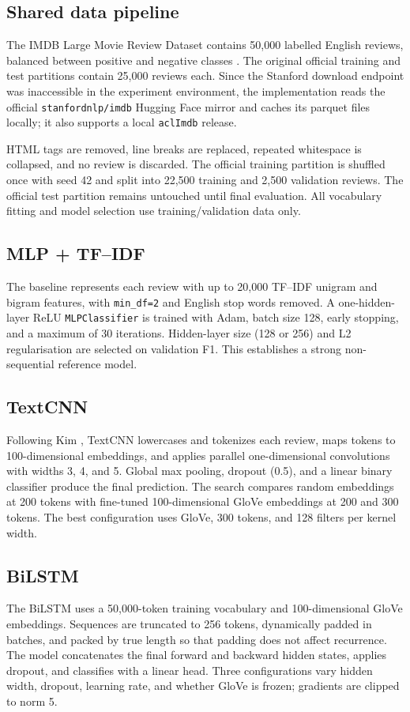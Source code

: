 \documentclass[12pt,a4paper]{article}
\begin{document}
\subsection{Shared data pipeline}
The IMDB Large Movie Review Dataset contains 50,000 labelled English reviews, balanced between positive and negative classes \cite{maas}. The original official training and test partitions contain 25,000 reviews each. Since the Stanford download endpoint was inaccessible in the experiment environment, the implementation reads the official \texttt{stanfordnlp/imdb} Hugging Face mirror and caches its parquet files locally; it also supports a local \texttt{aclImdb} release.

HTML tags are removed, line breaks are replaced, repeated whitespace is collapsed, and no review is discarded. The official training partition is shuffled once with seed 42 and split into 22,500 training and 2,500 validation reviews. The official test partition remains untouched until final evaluation. All vocabulary fitting and model selection use training/validation data only.

\subsection{MLP + TF--IDF}
The baseline represents each review with up to 20,000 TF--IDF unigram and bigram features, with \texttt{min\_df=2} and English stop words removed. A one-hidden-layer ReLU \texttt{MLPClassifier} is trained with Adam, batch size 128, early stopping, and a maximum of 30 iterations. Hidden-layer size (128 or 256) and L2 regularisation are selected on validation F1. This establishes a strong non-sequential reference model.

\subsection{TextCNN}
Following Kim \cite{kim}, TextCNN lowercases and tokenizes each review, maps tokens to 100-dimensional embeddings, and applies parallel one-dimensional convolutions with widths 3, 4, and 5. Global max pooling, dropout (0.5), and a linear binary classifier produce the final prediction. The search compares random embeddings at 200 tokens with fine-tuned 100-dimensional GloVe embeddings at 200 and 300 tokens. The best configuration uses GloVe, 300 tokens, and 128 filters per kernel width.

\subsection{BiLSTM}
The BiLSTM uses a 50,000-token training vocabulary and 100-dimensional GloVe embeddings. Sequences are truncated to 256 tokens, dynamically padded in batches, and packed by true length so that padding does not affect recurrence. The model concatenates the final forward and backward hidden states, applies dropout, and classifies with a linear head. Three configurations vary hidden width, dropout, learning rate, and whether GloVe is frozen; gradients are clipped to norm 5.
\end{document}
